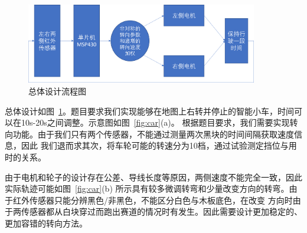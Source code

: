 \documentclass[a4paper,twoside,zihao=5,UTF8]{ctexart}
\begin{document}
\begin{spacing}{1.2}
\begin{figure}[htb]
	\centering
	\caption{总体设计流程图}
	\label{fig:flowchart}
	\includegraphics[width=0.9\textwidth]{flowchart.png}
\end{figure}

总体设计如图~\ref{fig:flowchart}。题目要求我们实现能够在地图上右转并停止的智能小车，时间可以在10s-20s之间调整。示意图如图~\ref{fig:car}(a)。
根据题目要求，我们需要实现转向功能。由于我们只有两个传感器，不能通过测量两次黑块的时间间隔获取速度信息，因此
我们退而求其次，将车轮可能的转速分为10档，通过试验测定挡位与用时的关系。

由于电机和轮子的设计存在公差、导线长度等原因，两侧速度不能完全一致，因此实际轨迹可能如图~\ref{fig:car}(b)
所示具有较多微调转弯和少量改变方向的转弯。由于红外传感器只能分辨黑色/非黑色，不能区分白色与木板底色，在改变
方向时由于两传感器都从白块穿过而跑出赛道的情况时有发生。因此需要设计更加稳定的、更加容错的转向方法。



\end{spacing}
\end{document}
